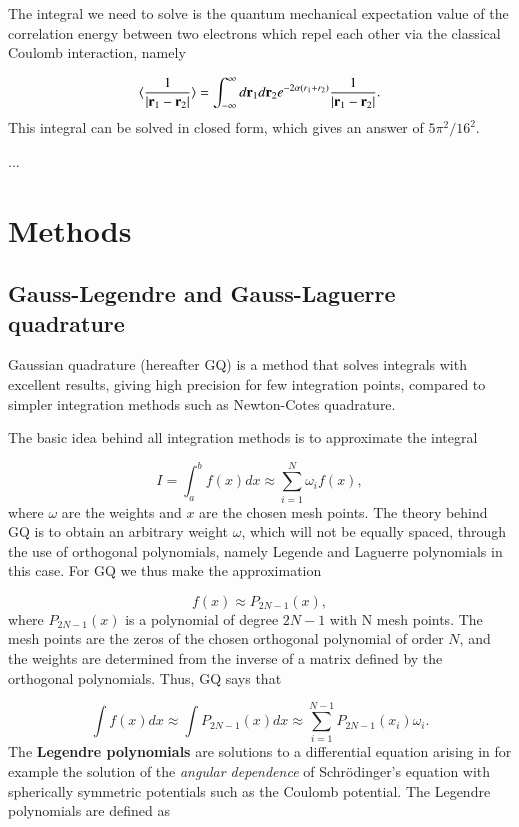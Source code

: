 \documentclass{article}
\begin{document}
\begin{multicols}{2}
The integral we need to solve is the quantum mechanical expectation value of the correlation energy between two electrons which repel each other via the classical Coulomb interaction, namely

\begin{equation}\label{eq:correlationenergy}
	\langle \frac{1}{|{\bf r}_1-{\bf r}_2|} \rangle = \int_{-\infty}^{\infty} d{\bf r}_1d{\bf r}_2  e^{-2\alpha (r_1+r_2)}\frac{1}{|{\bf r}_1-{\bf r}_2|}.
\end{equation}
This integral can be solved in closed form, which gives an answer of $5\pi^2/16^2$.


...


\section{Methods}

\subsection{Gauss-Legendre and Gauss-Laguerre quadrature}
Gaussian quadrature (hereafter GQ) is a method that solves integrals with excellent results, giving high precision for few integration points, compared to simpler integration methods such as Newton-Cotes quadrature. 

The basic idea behind all integration methods is to approximate the integral

\begin{equation}
	I = \int_a^b f(x) dx \approx \sum_{i = 1}^N \omega_i f(x),
\end{equation}
where $\omega$ are the weights and $x$ are the chosen mesh points. The theory behind GQ is to obtain an arbitrary weight $\omega$, which will not be equally spaced, through the use of orthogonal polynomials, namely Legende and Laguerre polynomials in this case. For GQ we thus make the approximation

\begin{equation}
	f(x) \approx P_{2N-1} (x),
\end{equation}
where $P_{2N-1} (x)$ is a polynomial of degree $2N-1$ with N mesh points. The mesh points are the zeros of the chosen orthogonal polynomial of order $N$, and the weights are determined from the inverse of a matrix defined by the orthogonal polynomials. Thus, GQ says that

\begin{equation}
	\int f(x) dx \approx \int P_{2N-1}(x) dx \approx \sum_{i = 1}^{N-1} P_{2N-1}(x_i) \omega_i.
\end{equation}
The \textbf{Legendre polynomials} are solutions to a differential equation arising in for example the solution of the \textit{angular dependence} of Schr\"{o}dinger's equation with spherically symmetric potentials such as the Coulomb potential. The Legendre polynomials are defined as


\end{multicols}
\end{document}
